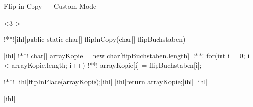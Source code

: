 \begin{frame}[fragile,c]{Flip in Copy --- Custom Mode}
\begin{center}
    \color{gray}
\end{center}
\SetupLstHl
\begin{uncoverenv}<3->
\begin{plainjava}
!**!|ihl|public static char[] flipInCopy(char[] flipBuchstaben) {|ihl|
!**!    char[] arrayKopie = new char[flipBuchstaben.length];
!**!    for(int i = 0; i < arrayKopie.length; i++)
!**!        arrayKopie[i] = flipBuchstaben[i];

!**!    |ihl|flipInPlace(arrayKopie);|ihl|
    |ihl|return arrayKopie;|ihl|
|ihl|}|ihl|
\end{plainjava}
\end{uncoverenv}
\end{frame}

